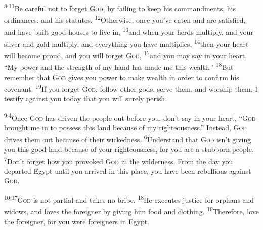 \documentclass[openany,12pt,english]{book}
\newenvironment{para}{\par\pretolerance=100\tolerance=200\setlength{\emergencystretch}{0.6em}\relax}{\par}
\begin{document}
\begin{para}
    \textsuperscript{8:11}\thinspace{}Be care\-ful not to for\-get \textsc{God}, by fail\-ing to keep his commandments, his ordinances, and his statutes.
    \textsuperscript{12}\thinspace{}Oth\-er\-wise, once you've eat\-en and are sat\-is\-fied, and have built good hous\-es to live in,
    \textsuperscript{13}\thinspace{}and when your herds mul\-ti\-ply, and your sil\-ver and gold mul\-ti\-ply, and eve\-ry\-thing you have multiplies,
    \textsuperscript{14}\thinspace{}then your heart will be\-come proud, and you will for\-get \textsc{God},
    \textsuperscript{17}\thinspace{}and you may say in your heart, “My pow\-er and the strength of my hand has made me this wealth.”
    \textsuperscript{18}\thinspace{}But re\-mem\-ber that \textsc{God} gives you pow\-er to make wealth in or\-der to con\-firm his cov\-e\-nant.
    \textsuperscript{19}\thinspace{}If you for\-get \textsc{God}, fol\-low oth\-er gods, serve them, and wor\-ship them, I tes\-ti\-fy a\-gainst you to\-day that you will sure\-ly per\-ish.
\end{para}

\bigskip{}

\begin{para}
    \textsuperscript{9:4}\thinspace{}Once \textsc{God} has driv\-en the peo\-ple out be\-fore you, don't say in your heart, “\textsc{God} brought me in to pos\-sess this land be\-cause of my right\-eous\-ness.” In\-stead, \textsc{God} drives them out be\-cause of their wick\-ed\-ness.
    \textsuperscript{6}\thinspace{}Un\-der\-stand that \textsc{God} is\-n't giv\-ing you this good land be\-cause of your right\-eous\-ness, for you are a stub\-born peo\-ple.
    \textsuperscript{7}\thinspace{}Don't for\-get how you pro\-voked \textsc{God} in the wil\-der\-ness. From the day you de\-part\-ed Egypt un\-til you ar\-rived in this place, you have been re\-bel\-lious a\-gainst \textsc{God}.
\end{para}

\bigskip{}

\begin{para}
    \textsuperscript{10:17}\thinspace{}\textsc{God} is not par\-tial and takes no bribe.
    \textsuperscript{18}\thinspace{}He executes jus\-tice for orphans and widows, and loves the for\-eign\-er by giv\-ing him food and cloth\-ing.
    \textsuperscript{19}\thinspace{}There\-fore, love the for\-eign\-er, for you were foreigners in Egypt.
\end{para}

\bigskip{}
\end{document}
